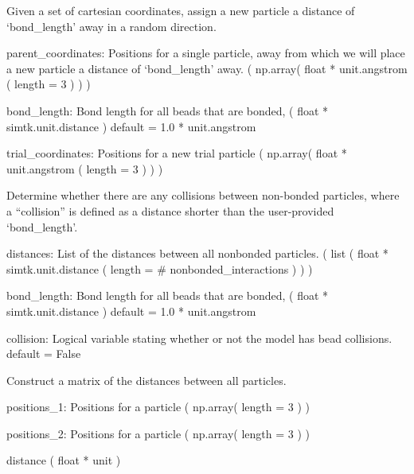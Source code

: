 \documentclass[letterpaper,12pt,english,openany,twoside]{sphinxmanual}
\begin{document}
\begin{fulllineitems}
\label{\detokenize{util:util.attempt_move}}
Given a set of cartesian coordinates, assign a new particle
a distance of ‘bond\_length’ away in a random direction.

parent\_coordinates: Positions for a single particle,
away from which we will place a new particle a distance
of ‘bond\_length’ away.
( np.array( float * unit.angstrom ( length = 3 ) ) )

bond\_length: Bond length for all beads that are bonded,
( float * simtk.unit.distance )
default = 1.0 * unit.angstrom

trial\_coordinates: Positions for a new trial particle
( np.array( float * unit.angstrom ( length = 3 ) ) )

\end{fulllineitems}


\begin{fulllineitems}
\label{\detokenize{util:util.collisions}}
Determine whether there are any collisions between non-bonded
particles, where a “collision” is defined as a distance shorter
than the user-provided ‘bond\_length’.

distances: List of the distances between all nonbonded particles.
( list ( float * simtk.unit.distance ( length = \# nonbonded\_interactions ) ) )

bond\_length: Bond length for all beads that are bonded,
( float * simtk.unit.distance )
default = 1.0 * unit.angstrom

collision: Logical variable stating whether or not the model has
bead collisions.
default = False

\end{fulllineitems}


\begin{fulllineitems}
\label{\detokenize{util:util.distance}}
Construct a matrix of the distances between all particles.

positions\_1: Positions for a particle
( np.array( length = 3 ) )

positions\_2: Positions for a particle
( np.array( length = 3 ) )

distance
( float * unit )

\end{fulllineitems}
\end{document}

